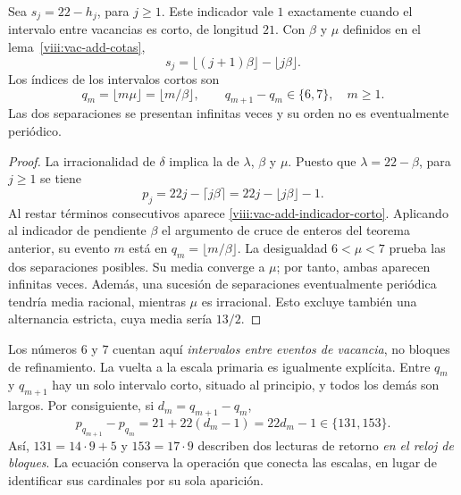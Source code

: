 \begin{theorem}
\label{viii:vac-add-teorema-secundario}
Sea \(s_j=22-h_j\), para \(j\geq1\). Este indicador vale \(1\)
exactamente cuando el intervalo entre vacancias es corto, de longitud
\(21\). Con \(\beta\) y \(\mu\) definidos en el
lema~\ref{viii:vac-add-cotas},
\begin{equation}
 s_j=\lfloor(j+1)\beta\rfloor-\lfloor j\beta\rfloor.
 \label{viii:vac-add-indicador-corto}
\end{equation}
Los índices de los intervalos cortos son
\begin{equation}
 q_m=\lfloor m\mu\rfloor=\lfloor m/\beta\rfloor,
 \qquad q_{m+1}-q_m\in\{6,7\},\quad m\geq1.
 \label{viii:vac-add-posiciones-cortos}
\end{equation}
Las dos separaciones se presentan infinitas veces y su orden no es
eventualmente periódico.
\end{theorem}
\begin{proof}
La irracionalidad de \(\delta\) implica la de \(\lambda\),
\(\beta\) y \(\mu\). Puesto que \(\lambda=22-\beta\), para
\(j\geq1\) se tiene
\[
 p_j=22j-\lceil j\beta\rceil
     =22j-\lfloor j\beta\rfloor-1.
\]
Al restar términos consecutivos aparece
\eqref{viii:vac-add-indicador-corto}. Aplicando al indicador de pendiente
\(\beta\) el argumento de cruce de enteros del teorema anterior,
su evento \(m\) está en \(q_m=\lfloor m/\beta\rfloor\).
La desigualdad \(6<\mu<7\) prueba las dos separaciones posibles.
Su media converge a \(\mu\); por tanto, ambas aparecen infinitas
veces. Además, una sucesión de separaciones eventualmente periódica
tendría media racional, mientras \(\mu\) es irracional. Esto excluye
también una alternancia estricta, cuya media sería \(13/2\).
\end{proof}

Los números \(6\) y \(7\) cuentan aquí \emph{intervalos entre eventos
de vacancia}, no bloques de refinamiento. La vuelta a la escala primaria
es igualmente explícita. Entre \(q_m\) y \(q_{m+1}\) hay un solo
intervalo corto, situado al principio, y todos los demás son largos.
Por consiguiente, si \(d_m=q_{m+1}-q_m\),
\begin{equation}
 p_{q_{m+1}}-p_{q_m}=21+22(d_m-1)=22d_m-1
 \in\{131,153\}.
 \label{viii:vac-add-retorno-bloques}
\end{equation}
Así, \(131=14\cdot9+5\) y \(153=17\cdot9\) describen dos lecturas
de retorno \emph{en el reloj de bloques}. La ecuación conserva la
operación que conecta las escalas, en lugar de identificar sus
cardinales por su sola aparición.

